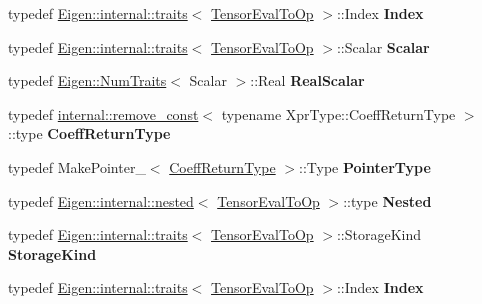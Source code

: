 \begin{DoxyCompactItemize}
\mbox{\label{class_eigen_1_1_tensor_eval_to_op_a890764064c48d0beb506f834bda6191d}} 
typedef \hyperlink{struct_eigen_1_1internal_1_1traits}{Eigen\+::internal\+::traits}$<$ \hyperlink{class_eigen_1_1_tensor_eval_to_op}{Tensor\+Eval\+To\+Op} $>$\+::Index {\bfseries Index}
\item 
\mbox{\label{class_eigen_1_1_tensor_eval_to_op_ae23381e5562d9ae2ff5c6ef56a6e0594}} 
typedef \hyperlink{struct_eigen_1_1internal_1_1traits}{Eigen\+::internal\+::traits}$<$ \hyperlink{class_eigen_1_1_tensor_eval_to_op}{Tensor\+Eval\+To\+Op} $>$\+::Scalar {\bfseries Scalar}
\item 
\mbox{\label{class_eigen_1_1_tensor_eval_to_op_a6ac1d179859bfd347528b1849a352a7c}} 
typedef \hyperlink{group___core___module_struct_eigen_1_1_num_traits}{Eigen\+::\+Num\+Traits}$<$ Scalar $>$\+::Real {\bfseries Real\+Scalar}
\item 
\mbox{\label{class_eigen_1_1_tensor_eval_to_op_a60130cd1135644b1dacf60f663b6b15a}} 
typedef \hyperlink{struct_eigen_1_1internal_1_1remove__const}{internal\+::remove\+\_\+const}$<$ typename Xpr\+Type\+::\+Coeff\+Return\+Type $>$\+::type {\bfseries Coeff\+Return\+Type}
\item 
\mbox{\label{class_eigen_1_1_tensor_eval_to_op_a3b269b528cfa6bca5424d51c7a591a1f}} 
typedef Make\+Pointer\+\_\+$<$ \hyperlink{group___sparse_core___module}{Coeff\+Return\+Type} $>$\+::Type {\bfseries Pointer\+Type}
\item 
\mbox{\label{class_eigen_1_1_tensor_eval_to_op_aceaa479fb7337589344bc6cee0401836}} 
typedef \hyperlink{struct_eigen_1_1internal_1_1nested}{Eigen\+::internal\+::nested}$<$ \hyperlink{class_eigen_1_1_tensor_eval_to_op}{Tensor\+Eval\+To\+Op} $>$\+::type {\bfseries Nested}
\item 
\mbox{\label{class_eigen_1_1_tensor_eval_to_op_a39cea47c21d4906be6a18fa6f2e47064}} 
typedef \hyperlink{struct_eigen_1_1internal_1_1traits}{Eigen\+::internal\+::traits}$<$ \hyperlink{class_eigen_1_1_tensor_eval_to_op}{Tensor\+Eval\+To\+Op} $>$\+::Storage\+Kind {\bfseries Storage\+Kind}
\item 
\mbox{\label{class_eigen_1_1_tensor_eval_to_op_a890764064c48d0beb506f834bda6191d}} 
typedef \hyperlink{struct_eigen_1_1internal_1_1traits}{Eigen\+::internal\+::traits}$<$ \hyperlink{class_eigen_1_1_tensor_eval_to_op}{Tensor\+Eval\+To\+Op} $>$\+::Index {\bfseries Index}
\end{DoxyCompactItemize}
